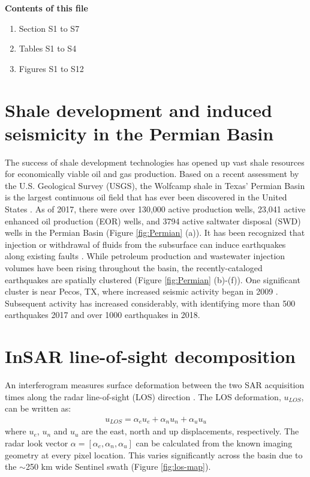\documentclass[draft,grl]{agutexSI2019}
\begin{document}
\begin{article}


\noindent\textbf{Contents of this file}
\begin{enumerate}
\item Section S1 to S7
\item Tables S1 to S4
\item Figures S1 to S12
\end{enumerate}

\clearpage

\section{Shale development and induced seismicity in the Permian Basin}
\label{sec:background}
The success of shale development technologies \cite{Waters2006use} has opened up vast shale resources for economically viable oil and gas production. Based on a recent assessment by the U.S. Geological Survey (USGS), the Wolfcamp shale in Texas' Permian Basin is the largest continuous oil field that has ever been discovered in the United States \cite{GaswirthAssessment2016}. As of 2017, there were over 130,000 active production wells, 23,041 active enhanced oil production (EOR) wells, and 3794 active saltwater disposal (SWD) wells in the Permian Basin (Figure \ref{fig:Permian} (a)). It has been recognized that injection or withdrawal of fluids from the subsurface can induce earthquakes along existing faults \cite{Ellsworth2013, simpson1988two}. While petroleum production and wastewater injection volumes have been rising throughout the basin, the recently-cataloged earthquakes are spatially clustered (Figure \ref{fig:Permian} (b)-(f)). One significant cluster is near Pecos, TX, where increased seismic activity began in 2009 \cite{Frohlich2019}. Subsequent activity has increased considerably, with  identifying more than 500 earthquakes 2017 and over 1000 earthquakes in 2018.


\section{InSAR line-of-sight decomposition}
\label{sec:los}
An interferogram measures surface deformation between the two SAR acquisition times along the radar line-of-sight (LOS) direction \cite{Hanssen2001}. The LOS deformation, $u_{LOS}$, can be written as: 
\begin{align}
u_{LOS}= \alpha_{e} u_{e} + \alpha_{n} u_{n} + \alpha_{u} u_{u}
\end{align}
where $u_{e}$, $u_{n}$ and $u_{u}$ are the east, north and up displacements, respectively. The radar look vector $\alpha = [\alpha_e, \alpha_n, \alpha_u]$ can be calculated from the known imaging geometry at every pixel location. This varies significantly across the basin due to the $ \sim$250 km wide Sentinel swath (Figure \ref{fig:los-map}). 


\end{article}
\end{document}

